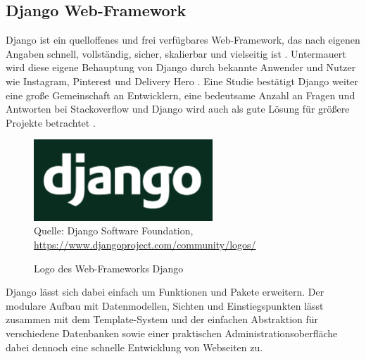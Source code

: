 \documentclass[12pt,oneside,titlepage,listof=totoc,bibliography=totoc]{scrartcl}
\begin{document}


\subsection{Django Web-Framework}

Django ist ein quelloffenes und frei verfügbares Web-Framework, das nach eigenen Angaben schnell, vollständig, sicher, skalierbar und vielseitig ist \parencite[]{54-django-overview}. Untermauert wird diese eigene Behauptung von Django durch bekannte Anwender und Nutzer wie Instagram, Pinterest und Delivery Hero \parencite{56-django-stackshare}. Eine Studie bestätigt Django weiter eine große Gemeinschaft an Entwicklern, eine bedeutsame Anzahl an Fragen und Antworten bei Stackoverflow und Django wird auch als gute Lösung für größere Projekte betrachtet \parencite{55-djnago-ghimire}. 

\begin{figure}[H]
	\caption{Logo des Web-Frameworks Django}\label{fig:django-logo}
	\includegraphics[width=0.6\textwidth]{django-logo-negative.png}
	\\
	Quelle: Django Software Foundation, \url{https://www.djangoproject.com/community/logos/}
\end{figure}

Django lässt sich dabei einfach um Funktionen und Pakete erweitern. Der modulare Aufbau mit Datenmodellen, Sichten und Einstiegspunkten lässt zusammen mit dem Template-System und der einfachen Abstraktion für verschiedene Datenbanken sowie einer praktischen Administrationsoberfläche dabei dennoch eine schnelle Entwicklung von Webseiten zu.



\end{document}
